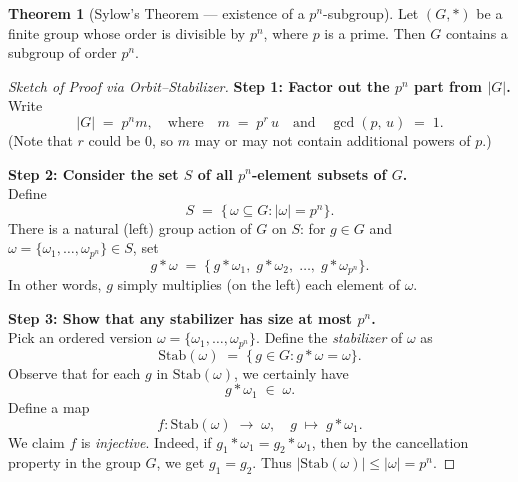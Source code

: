 \documentclass[12pt]{article}
\title{}
\author{Jerich Lee}
\date{\today}
\theoremstyle{definition} %
\newtheorem{theorem}{Theorem}
\theoremstyle{plain} %
\begin{document}
\maketitle
\begin{theorem}[Sylow's Theorem --- existence of a $p^n$-subgroup]
    Let $(G, *)$ be a finite group whose order is divisible by $p^n$, where $p$ is a prime.
    Then $G$ contains a subgroup of order $p^n$.
    \end{theorem}
    
    \begin{proof}[Sketch of Proof via Orbit--Stabilizer]
    
    \textbf{Step 1: Factor out the $p^n$ part from $|G|$.}\\
    Write 
    \[
       |G| \;=\; p^n m,
       \quad\text{where}\quad
       m \;=\; p^r\,u
       \quad\text{and}\quad
       \gcd(p,\,u) \;=\; 1.
    \]
    (Note that $r$ could be $0$, so $m$ may or may not contain additional powers of $p$.)
    
    \medskip
    
    \textbf{Step 2: Consider the set $S$ of all $p^n$-element subsets of $G$.}\\
    Define
    \[
      S \;=\; \{\, \omega \subseteq G : |\omega| = p^n \}.
    \]
    There is a natural (left) group action of $G$ on $S$:
    for $g \in G$ and $\omega = \{\omega_1, \dots, \omega_{p^n}\} \in S$, set
    \[
       g * \omega 
       \;=\; \{\,g * \omega_1,\;g * \omega_2,\;\dots,\;g * \omega_{p^n}\}.
    \]
    In other words, $g$ simply multiplies (on the left) each element of $\omega$.
    
    \medskip
    
    \textbf{Step 3: Show that any stabilizer has size at most $p^n$.}\\
    Pick an ordered version $\omega = \{\omega_1, \dots, \omega_{p^n}\}$.  
    Define the \emph{stabilizer} of $\omega$ as 
    \[
      \mathrm{Stab}(\omega) \;=\; \{\,g \in G : g * \omega = \omega\}.
    \]
    Observe that for each $g$ in $\mathrm{Stab}(\omega)$, we certainly have 
    \[
       g * \omega_1 \;\in\; \omega.
    \]
    Define a map
    \[
       f \colon \mathrm{Stab}(\omega) \;\longrightarrow\; \omega,
       \quad g \;\mapsto\; g * \omega_1.
    \]
    We claim $f$ is \emph{injective}.  Indeed, if $g_1 * \omega_1 = g_2 * \omega_1$, 
    then by the cancellation property in the group $G$, we get $g_1 = g_2$.  
    Thus $|\mathrm{Stab}(\omega)| \le |\omega| = p^n.$
    

\end{proof}
\end{document}
